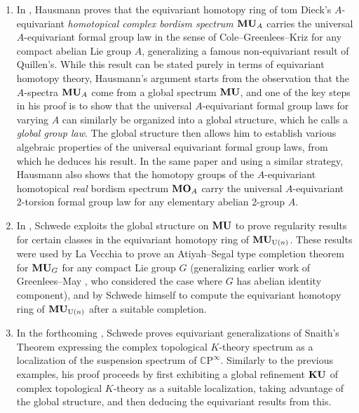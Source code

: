 \documentclass[reqno]{memo-l}
\theoremstyle{mythm}
\theoremstyle{definition}
\numberwithin{equation}{section}
\newcommand{\C} {{\mathbb{C}}}
\newcommand{\cat}[1]{\textbf{\textup{#1}}}
\begin{document}
\begin{enumerate}
    \item\label{item:global-group-law} In \cite{hausmann2022global}, Hausmann proves that the equivariant homotopy ring of tom Dieck's $A$-equivariant \emph{homotopical complex bordism spectrum} $\cat{MU}_A$ carries the universal $A$-equivariant formal group law in the sense of Cole--Greenlees--Kriz for any compact abelian Lie group $A$, generalizing a famous non-equivariant result of Quillen's. While this result can be stated purely in terms of equivariant homotopy theory, Hausmann's argument starts from the observation that the $A$-spectra $\cat{MU}_A$ come from a global spectrum $\cat{MU}$, and one of the key steps in his proof is to show that the universal $A$-equivariant formal group laws for varying $A$ can similarly be organized into a global structure, which he calls a \emph{global group law}. The global structure then allows him to establish various algebraic properties of the universal equivariant formal group laws, from which he deduces his result. In the same paper and using a similar strategy, Hausmann also shows that the homotopy groups of the $A$-equivariant homotopical \emph{real} bordism spectrum $\cat{MO}_A$ carry the universal $A$-equivariant 2-torsion formal group law for any elementary abelian 2-group $A$. 
    \item In \cite{schwede-euler}, Schwede exploits the global structure on $\cat{MU}$ to prove regularity results for certain classes in the equivariant homotopy ring of $\cat{MU}_{\text{U}(n)}$. These results were used by La Vecchia \cite{lavecchia} to prove an Atiyah--Segal type completion theorem for $\cat{MU}_G$ for any compact Lie group $G$ (generalizing earlier work of Greenlees--May \cite{GM-MU}, who considered the case where $G$ has abelian identity component), and by Schwede himself \cite{schwede-chern} to compute the equivariant homotopy ring of $\cat{MU}_{\text{U}(n)}$ after a suitable completion.    
    \item\label{item:global-snaith} In the forthcoming \cite{schwede2025snaith}, Schwede proves equivariant generalizations of Snaith's Theorem \cite{snaith} expressing the complex topological $K$-theory spectrum as a localization of the suspension spectrum of $\C\text{P}^\infty$. Similarly to the previous examples, his proof proceeds by first exhibiting a global refinement $\cat{KU}$ of complex topological $K$-theory as a suitable localization, taking advantage of the global structure, and then deducing the equivariant results from this.
\end{enumerate}
\end{document}
